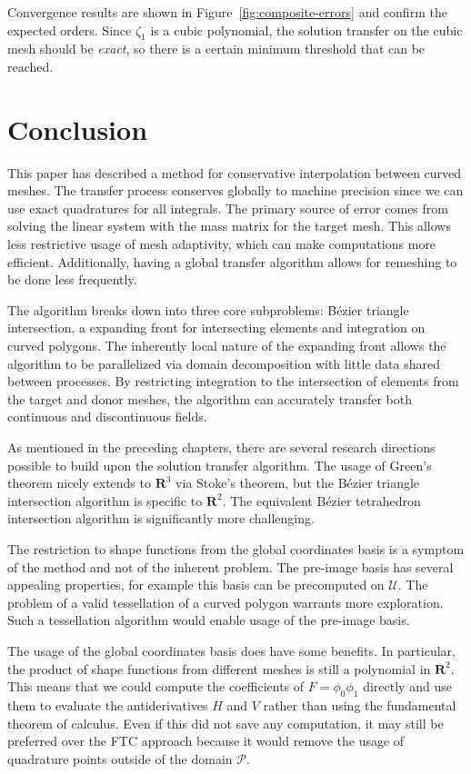 \documentclass[letterpaper,10pt]{article}
\theoremstyle{definition}
\newcommand{\reals}{\mathbf{R}}
\newcommand{\utri}{\mathcal{U}}
\begin{document}
Convergence results are shown in Figure~\ref{fig:composite-errors}
and confirm the expected orders. Since \(\zeta_1\) is a cubic polynomial,
the solution transfer on the cubic mesh should be \emph{exact}, so there
is a certain minimum threshold that can be reached.

\section{Conclusion}

This paper has described a method for conservative interpolation
between curved meshes. The transfer process conserves globally
to machine precision since we can use exact quadratures for all
integrals. The primary source of error comes from solving the linear
system with the mass matrix for the target mesh. This allows
less restrictive usage of mesh adaptivity, which can make computations
more efficient. Additionally, having a global transfer algorithm
allows for remeshing to be done less frequently.

The algorithm breaks down into three core subproblems: B\'{e}zier triangle
intersection, a expanding front for intersecting elements and
integration on curved polygons. The inherently local nature of the
expanding front allows the algorithm to be parallelized via domain
decomposition with little data shared between processes. By
restricting integration to the intersection of elements from the
target and donor meshes, the algorithm can accurately transfer
both continuous and discontinuous fields.

As mentioned in the preceding chapters, there are several research
directions possible to build upon the solution transfer algorithm.
The usage of Green's theorem nicely extends to \(\reals^3\) via
Stoke's theorem, but the B\'{e}zier triangle intersection algorithm
is specific to \(\reals^2\). The equivalent B\'{e}zier tetrahedron
intersection algorithm is significantly more challenging.

The restriction to shape functions from the global coordinates basis
is a symptom of the method and not of the inherent problem. The
pre-image basis has several appealing properties, for example
this basis can be precomputed on \(\utri\). The problem of a
valid tessellation of a curved polygon warrants more exploration.
Such a tessellation algorithm would enable usage of the pre-image
basis.

The usage of the global coordinates basis does have some benefits.
In particular, the product of shape functions from different meshes
is still a polynomial in \(\reals^2\). This means that we could
compute the coefficients of \(F = \phi_0 \phi_1\) directly and
use them to evaluate the antiderivatives \(H\) and \(V\) rather
than using the fundamental theorem of calculus. Even if this
did not save any computation, it may still be preferred over
the FTC approach because it would remove the usage of quadrature
points outside of the domain \(\mathcal{P}\).
\end{document}

